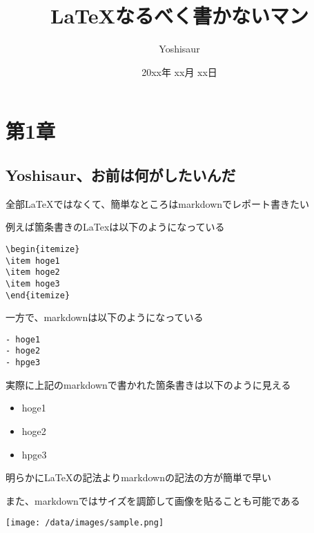 \documentclass[
  12pt,
  a4j]{ltjarticle}
\title{LaTeXなるべく書かないマン}
\author{Yoshisaur}
\date{20xx年 xx月 xx日}
\providecommand{\tightlist}{%
  \setlength{\itemsep}{0pt}\setlength{\parskip}{0pt}}
\let\origfigure\figure
\let\endorigfigure\endfigure
\renewenvironment{figure}[1][2] {
    \expandafter\origfigure\expandafter[H]
} {
    \endorigfigure
}
\begin{document}
\maketitle

\clearpage

\hypertarget{ux7b2c1ux7ae0}{%
\section{第1章}\label{ux7b2c1ux7ae0}}

\hypertarget{yoshisaurux304aux524dux306fux4f55ux304cux3057ux305fux3044ux3093ux3060}{%
\subsection{Yoshisaur、お前は何がしたいんだ}\label{yoshisaurux304aux524dux306fux4f55ux304cux3057ux305fux3044ux3093ux3060}}

全部LaTeXではなくて、簡単なところはmarkdownでレポート書きたい

例えば箇条書きのLaTexは以下のようになっている

\begin{lstlisting}[title=LaTeXの箇条書き]
\begin{itemize}
\item hoge1
\item hoge2
\item hoge3
\end{itemize}
\end{lstlisting}

一方で、markdownは以下のようになっている

\begin{lstlisting}[title=markdownの箇条書き]
- hoge1
- hoge2
- hpge3
\end{lstlisting}

実際に上記のmarkdownで書かれた箇条書きは以下のように見える

\begin{itemize}
\tightlist
\item
  hoge1
\item
  hoge2
\item
  hpge3
\end{itemize}

明らかにLaTeXの記法よりmarkdownの記法の方が簡単で早い

また、markdownではサイズを調節して画像を貼ることも可能である

\begin{figure}
\centering
\texttt{[image: /data/images/sample.png]}
\caption{画像のサンプル}
\end{figure}
\end{document}
